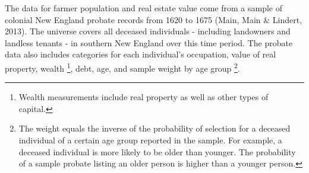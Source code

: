 \documentclass[11pt]{article}
\begin{document}
The data for farmer population and real estate value come from a sample of colonial New England probate records from 1620 to 1675 (Main, Main \& Lindert, 2013). The universe covers all deceased individuals - including landowners and landless tenants - in southern New England over this time period. The probate data also includes categories for each individual's occupation, value of real property, wealth \footnote{Wealth measurements include real property as well as other types of capital.}, debt, age, and sample weight by age group \footnote{The weight equals the inverse of the probability of selection for a deceased individual of a certain age group reported in the sample. For example, a deceased individual is more likely to be older than younger. The probability of a sample probate listing an older person is higher than a younger person.}.


\end{document}
